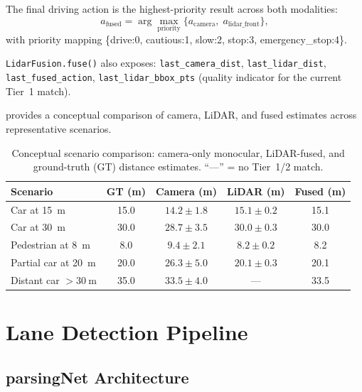 \documentclass[12pt,a4paper]{article}
\begin{document}
The final driving action is the highest-priority result across both
modalities:
\begin{equation}
  a_{\text{fused}} = \arg\max_{\text{priority}}
  \bigl\{a_{\text{camera}},\; a_{\text{lidar\_front}}\bigr\},
  \label{eq:fused_action}
\end{equation}
with priority mapping
\{drive:0, cautious:1, slow:2, stop:3, emergency\_stop:4\}.

\texttt{LidarFusion.fuse()} also exposes:
\texttt{last\_camera\_dist}, \texttt{last\_lidar\_dist},
\texttt{last\_fused\_action}, \texttt{last\_lidar\_bbox\_pts} (quality
indicator for the current Tier~1 match).

 provides a conceptual comparison of camera,
LiDAR, and fused estimates across representative scenarios.

\begin{table}[H]
\centering
\caption{Conceptual scenario comparison: camera-only monocular, LiDAR-fused,
  and ground-truth (GT) distance estimates.  ``---'' = no Tier~1/2 match.}
\label{tab:fusion_comparison}
\begin{tabular}{@{}lcccc@{}}
\toprule
\textbf{Scenario}
& \textbf{GT (m)} & \textbf{Camera (m)}
& \textbf{LiDAR (m)} & \textbf{Fused (m)} \\
\midrule
Car at \SI{15}{\metre}           & 15.0 & $14.2\!\pm\!1.8$ & $15.1\!\pm\!0.2$ & 15.1 \\
Car at \SI{30}{\metre}           & 30.0 & $28.7\!\pm\!3.5$ & $30.0\!\pm\!0.3$ & 30.0 \\
Pedestrian at \SI{8}{\metre}     & 8.0  & $9.4\!\pm\!2.1$  & $8.2\!\pm\!0.2$  & 8.2  \\
Partial car at \SI{20}{\metre}   & 20.0 & $26.3\!\pm\!5.0$ & $20.1\!\pm\!0.3$ & 20.1 \\
Distant car $>\SI{30}{\metre}$   & 35.0 & $33.5\!\pm\!4.0$ & ---              & 33.5 \\
\bottomrule
\end{tabular}
\end{table}

\section{Lane Detection Pipeline}
\label{sec:lanes}

\subsection{parsingNet Architecture}
\label{subsec:parsingnet_arch}
\end{document}
